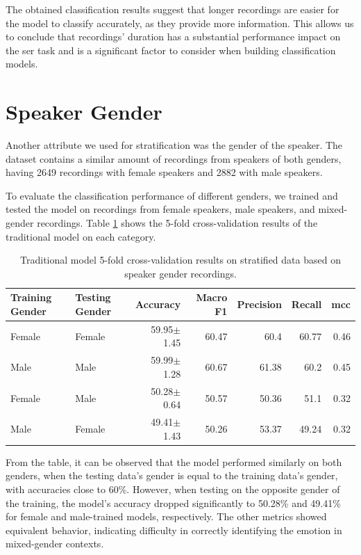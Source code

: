 The obtained classification results suggest that longer recordings are easier for the model to classify accurately, as they provide more information. This allows us to conclude that recordings' duration has a substantial performance impact on the \ac{ser} task and is a significant factor to consider when building classification models.

\section{Speaker Gender}

Another attribute we used for stratification was the gender of the speaker. The dataset contains a similar amount of recordings from speakers of both genders, having 2649 recordings with female speakers and 2882 with male speakers.

To evaluate the classification performance of different genders, we trained and tested the model on recordings from female speakers, male speakers, and mixed-gender recordings. Table \ref{5:gender} shows the 5-fold cross-validation results of the traditional model on each category.

\begin{table}[H]
	\centering
	\caption{Traditional model 5-fold cross-validation results on stratified data based on speaker gender recordings.}
	\label{5:gender}
	\begin{tabular}{llrrrrr}
		\toprule
		Training Gender & Testing Gender & Accuracy    &   Macro F1 &   Precision &   Recall &   \ac{mcc} \\
		\midrule
		Female 	& Female & 59.95$\pm$1.45 & 60.47 &       60.4  &    60.77 &   0.46 \\
		Male 	& Male   & 59.99$\pm$1.28 & 60.67 &       61.38 &    60.2  &   0.45 \\
		
		\addlinespace
		
		Female  & Male	 & 50.28$\pm$0.64 &  50.57 &       50.36 &    51.1  &   0.32 \\
		Male    & Female & 49.41$\pm$1.43 &  50.26 &       53.37 &    49.24 &   0.32 \\
		\bottomrule
	\end{tabular}
\end{table}

From the table, it can be observed that the model performed similarly on both genders, when the testing data's gender is equal to the training data's gender, with accuracies close to 60\%. However, when testing on the opposite gender of the training, the model's accuracy dropped significantly to 50.28\% and 49.41\% for female and male-trained models, respectively. The other metrics showed equivalent behavior, indicating difficulty in correctly identifying the emotion in mixed-gender contexts.

